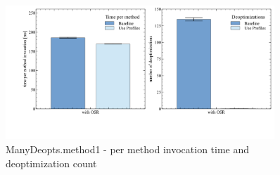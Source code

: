 \begin{figure}[ht!]
  \begin{center}
    \centering
    \includegraphics[width=0.9\textwidth]{figures/manydeopt.png}
    \caption{ManyDeopts.method1 - per method invocation time and deoptimization count}
    \label{f:manydeopts}
  \end{center}
\end{figure}
\\\\
